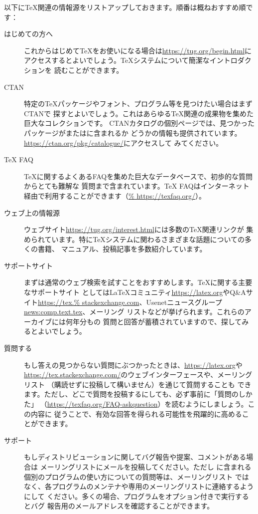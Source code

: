 \documentclass[uplatex,dvipdfmx,12pt,tombow]{jsarticle}
\begin{document}
以下に\TeX 関連の情報源をリストアップしておきます。順番は概ねおすすめ順です：
%
\begin{description}
\item[はじめての方へ]
これからはじめて\TeX をお使いになる場合は\url{https://tug.org/begin.html}に
アクセスするとよいでしょう。\TeX システムについて簡潔なイントロダクションを
読むことができます。

\item[CTAN]
特定の\TeX パッケージやフォント、プログラム等を見つけたい場合はまずCTANで
探すとよいでしょう。これはあらゆる\TeX 関連の成果物を集めた巨大なコレクションです。
CTANカタログの個別ページでは、見つかったパッケージが\TL または\MIKTEX に含まれるか
どうかの情報も提供されています。\url{https://ctan.org/pkg/catalogue/}にアクセスして
みてください。

\item[{\TeX} FAQ]
\TeX に関するよくあるFAQを集めた巨大なデータベースで、初歩的な質問からとても難解な
質問まで含まれています。{\TeX} FAQはインターネット経由で利用することができます（\url{%
https://texfaq.org/}）。

\item[ウェブ上の情報源]
ウェブサイト\url{https://tug.org/interest.html}には多数の\TeX 関連リンクが
集められています。特に\TeX システムに関わるさまざまな話題についての多くの書籍、
マニュアル、投稿記事を多数紹介しています。

\item[サポートサイト]
まずは通常のウェブ検索を試すことをおすすめします。\TeX に関する主要なサポートサイト
としては\LaTeX コミュニティ\url{https://latex.org}やQ\&Aサイト\url{https://tex.%
stackexchange.com}、Usenetニュースグループ\url{news:comp.text.tex}、メーリング
リストなどが挙げられます。これらのアーカイブには何年分もの
質問と回答が蓄積されていますので、探してみるとよいでしょう。

\item[質問する]
もし答えの見つからない質問にぶつかったときは、\url{https://latex.org}や
\url{https://tex.stackexchange.com/}のウェブインターフェースや、メーリングリスト
（購読せずに投稿して構いません）を通じて質問することも
できます。ただし、どこで質問を投稿するにしても、必ず事前に「質問のしかた」
（\url{https://texfaq.org/FAQ-askquestion}）を読むようにしましょう。この内容に
従うことで、有効な回答を得られる可能性を飛躍的に高めることができます。

\item[\TL サポート]
もし\TL ディストリビューションに関してバグ報告や提案、コメントがある場合は
\TL メーリングリストにメールを投稿してください。ただし
\TL に含まれる個別のプログラムの使い方についての質問等は、\TL メーリングリスト
ではなく、各プログラムのメンテナや専用のメーリングリストに連絡するようにして
ください。多くの場合、プログラムをオプション付きで実行するとバグ
報告用のメールアドレスを確認することができます。
\end{description}
\end{document}
